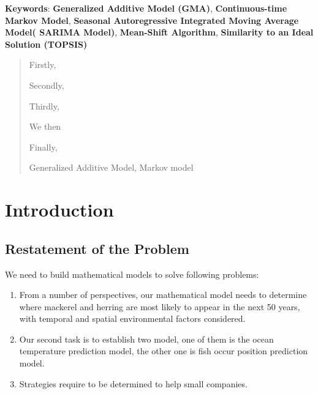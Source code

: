 \documentclass{mcmthesis}
\begin{document}
\textbf{Keywords}: \textbf{Generalized Additive Model (GMA)}, \textbf{Continuous-time Markov Model}, \textbf{Seasonal Autoregressive Integrated Moving Average Model( SARIMA Model)}, \textbf{Mean-Shift Algorithm}, \textbf{Similarity to an Ideal Solution (TOPSIS)}


\clearpage
\pagestyle{fancy}


\setcounter{page}{1}


\begin{abstract}
Firstly,\cite{1}

Secondly,

Thirdly,

We then

Finally,

\begin{keywords}
Generalized Additive Model, Markov model
\end{keywords}
\end{abstract}
\maketitle

\tableofcontents


\section{Introduction}
\subsection{Restatement of the Problem}

We need to build mathematical models to solve following problems:

\begin{enumerate}
\item From a number of perspectives, our mathematical model needs to determine where mackerel and herring are most likely to appear in the next 50 years, with temporal and spatial environmental factors considered.
\item Our second task is to establish two model, one of them is the ocean temperature prediction model, the other one is fish occur position prediction model.
\item Strategies require to be determined to help small companies.
\end{enumerate}
\end{document}
